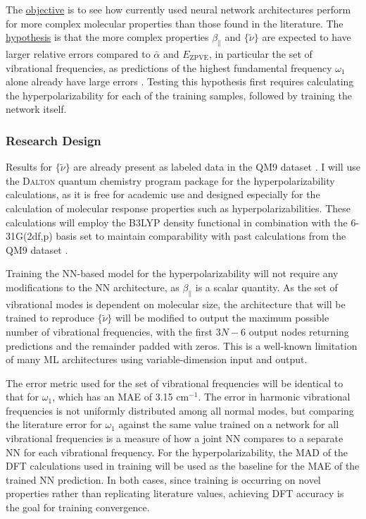 \documentclass[12pt]{article}
\begin{document}
The \uline{objective} is to see how currently used neural network architectures perform for more complex molecular properties than those found in the literature. The \uline{hypothesis} is that the more complex properties \(\beta_{\parallel}\) and \(\{\tilde{\nu}\}\) are expected to have larger relative errors compared to \(\bar{\alpha}\) and \(E_{\text{ZPVE}}\), in particular the set of vibrational frequencies, as predictions of the highest fundamental frequency \(\omega_1\) alone already have large errors \cite{2017arXiv170205532F}. Testing this hypothesis first requires calculating the hyperpolarizability for each of the training samples, followed by training the network itself.

\subsubsection{Research Design}
\label{sec:org416a78e}

Results for \(\{\tilde{\nu}\}\) are already present as labeled data in the QM9 dataset \cite{Ramakrishnan:2014ij}. I will use the \textsc{Dalton} quantum chemistry program package \cite{daltonpaper} for the hyperpolarizability calculations, as it is free for academic use and designed especially for the calculation of molecular response properties such as hyperpolarizabilities. These calculations will employ the B3LYP density functional in combination with the 6-31G(2df,p) basis set to maintain comparability with past calculations from the QM9 dataset \cite{Ramakrishnan:2014ij}.

Training the NN-based model for the hyperpolarizability will not require any modifications to the NN architecture, as \(\beta_{\parallel}\) is a scalar quantity. As the set of vibrational modes is dependent on molecular size, the architecture that will be trained to reproduce \(\{\tilde{\nu}\}\) will be modified to output the maximum possible number of vibrational frequencies, with the first \(3N-6\) output nodes returning predictions and the remainder padded with zeros. This is a well-known limitation of many ML architectures using variable-dimension input and output.

The error metric used for the set of vibrational frequencies will be identical to that for \(\omega_1\), which has an MAE of 3.15 cm\(^{-1}\). The error in harmonic vibrational frequencies is not uniformly distributed among all normal modes\fxnote{[REF]}, but comparing the literature error for \(\omega_1\) against the same value trained on a network for all vibrational frequencies is a measure of how a joint NN compares to a separate NN for each vibrational frequency. For the hyperpolarizability, the MAD of the DFT calculations used in training will be used as the baseline for the MAE of the trained NN prediction. In both cases, since training is occurring on novel properties rather than replicating literature values, achieving DFT accuracy is the goal for training convergence.
\end{document}
